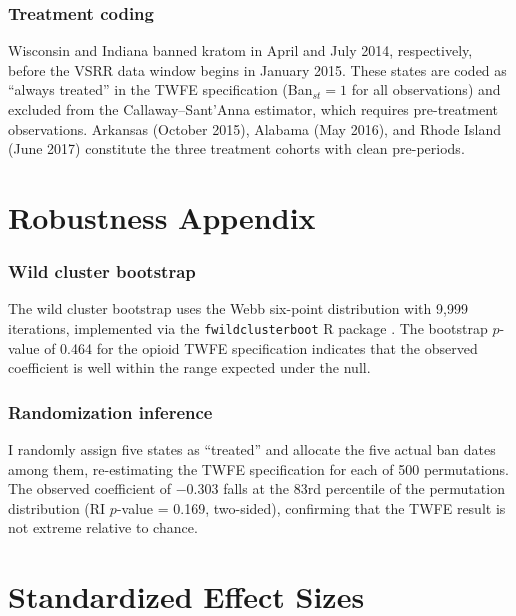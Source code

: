 \documentclass[12pt]{article}
\begin{document}
\subsubsection*{Treatment coding} Wisconsin and Indiana banned kratom in April and July 2014, respectively, before the VSRR data window begins in January 2015. These states are coded as ``always treated'' in the TWFE specification (Ban$_{st} = 1$ for all observations) and excluded from the Callaway--Sant'Anna estimator, which requires pre-treatment observations. Arkansas (October 2015), Alabama (May 2016), and Rhode Island (June 2017) constitute the three treatment cohorts with clean pre-periods.

\section{Robustness Appendix}
\label{sec:robust_appendix}

\subsubsection*{Wild cluster bootstrap} The wild cluster bootstrap uses the Webb six-point distribution with 9,999 iterations, implemented via the \texttt{fwildclusterboot} R package \citep{fischer2021fwildclusterboot}. The bootstrap $p$-value of 0.464 for the opioid TWFE specification indicates that the observed coefficient is well within the range expected under the null.

\subsubsection*{Randomization inference} I randomly assign five states as ``treated'' and allocate the five actual ban dates among them, re-estimating the TWFE specification for each of 500 permutations. The observed coefficient of $-0.303$ falls at the 83rd percentile of the permutation distribution (RI $p$-value = 0.169, two-sided), confirming that the TWFE result is not extreme relative to chance.

\section{Standardized Effect Sizes}
\label{sec:sde}


\end{document}
